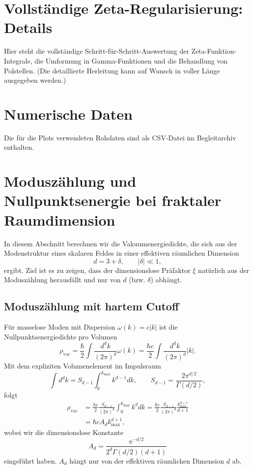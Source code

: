 	\appendix
	\section{Vollständige Zeta-Regularisierung: Details}
	\label{app:zeta_full}
	
	Hier steht die vollständige Schritt-für-Schritt-Auswertung der Zeta-Funktion-Integrale, die Umformung in Gamma-Funktionen und die Behandlung von Polstellen. (Die detaillierte Herleitung kann auf Wunsch in voller Länge ausgegeben werden.)
	
	\section{Numerische Daten}
	Die für die Plots verwendeten Rohdaten sind als CSV-Datei im Begleitarchiv enthalten.
	
	\section{Moduszählung und Nullpunktsenergie bei fraktaler Raumdimension}
	\label{sec:modecounting}
	
	In diesem Abschnitt berechnen wir die Vakuumenergiedichte, die sich aus der Modenstruktur eines skalaren Feldes in einer effektiven räumlichen Dimension
	\[
	d = 3 + \delta,\qquad |\delta|\ll 1,
	\]
	ergibt. Ziel ist es zu zeigen, dass der dimensionslose Präfaktor \(\xi\) natürlich aus der Moduszählung herausfällt und nur von \(d\) (bzw. \(\delta\)) abhängt.
	
	\subsection{Moduszählung mit hartem Cutoff}
	Für masselose Moden mit Dispersion \(\omega(k)=c|k|\) ist die Nullpunktsenergiedichte pro Volumen
	\[
	\rho_{\mathrm{vac}} = \frac{\hbar}{2}\int \frac{d^{d}k}{(2\pi)^d}\omega(k)
	= \frac{\hbar c}{2}\int\frac{d^{d}k}{(2\pi)^d}|k|.
	\]
	Mit dem expliziten Volumenelement im Impulsraum
	\[
	\int d^{d}k = S_{d-1}\int_0^{k_{\max}} k^{d-1}dk,
	\qquad
	S_{d-1}=\frac{2\pi^{d/2}}{\Gamma(d/2)},
	\]
	folgt
	\begin{align}
		\rho_{\mathrm{vac}}
		&= \frac{\hbar c}{2}\frac{S_{d-1}}{(2\pi)^d}\int_0^{k_{\max}} k^{d}dk
		= \frac{\hbar c}{2}\frac{S_{d-1}}{(2\pi)^d}\frac{k_{\max}^{d+1}}{d+1}
		\nonumber\\
		&= \hbar c  A_d  k_{\max}^{d+1},
		\label{eq:rho_Ad}
	\end{align}
	wobei wir die dimensionslose Konstante
	\[
	\boxed{A_d = \dfrac{\pi^{-d/2}}{2^d\Gamma(d/2)(d+1)}}
	\]
	eingeführt haben. \(A_d\) hängt nur von der effektiven räumlichen Dimension \(d\) ab.
	
